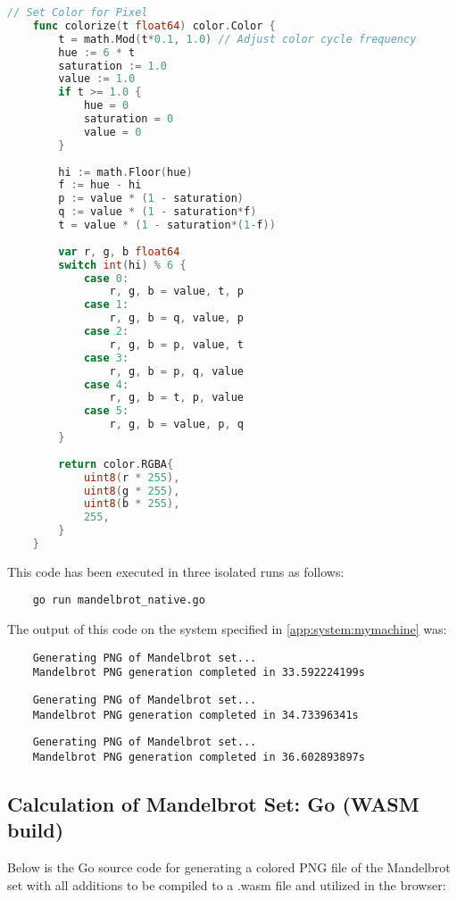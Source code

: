 \begin{lstlisting}[language=go, frame=tb, caption={Mandelbrot Set Calculation}]
    // Set Color for Pixel
    func colorize(t float64) color.Color {
        t = math.Mod(t*0.1, 1.0) // Adjust color cycle frequency
        hue := 6 * t
        saturation := 1.0
        value := 1.0
        if t >= 1.0 {
            hue = 0
            saturation = 0
            value = 0
        }
    
        hi := math.Floor(hue)
        f := hue - hi
        p := value * (1 - saturation)
        q := value * (1 - saturation*f)
        t = value * (1 - saturation*(1-f))
    
        var r, g, b float64
        switch int(hi) % 6 {
            case 0:
                r, g, b = value, t, p
            case 1:
                r, g, b = q, value, p
            case 2:
                r, g, b = p, value, t
            case 3:
                r, g, b = p, q, value
            case 4:
                r, g, b = t, p, value
            case 5:
                r, g, b = value, p, q
        }
    
        return color.RGBA{
            uint8(r * 255),
            uint8(g * 255),
            uint8(b * 255),
            255,
        }
    }    
\end{lstlisting}

This code has been executed in three isolated runs as follows:
\begin{lstlisting}
    go run mandelbrot_native.go
\end{lstlisting}

The output of this code on the system specified in \ref{app:system:mymachine} was:
\begin{lstlisting}
    Generating PNG of Mandelbrot set... 
    Mandelbrot PNG generation completed in 33.592224199s
\end{lstlisting}
\begin{lstlisting}
    Generating PNG of Mandelbrot set... 
    Mandelbrot PNG generation completed in 34.73396341s
\end{lstlisting}
\begin{lstlisting}
    Generating PNG of Mandelbrot set... 
    Mandelbrot PNG generation completed in 36.602893897s
\end{lstlisting}

\subsection{Calculation of Mandelbrot Set: Go (WASM build)}
\label{app:code:mandelbrot2}
Below is the Go source code for generating a colored PNG file of the Mandelbrot set with all additions to be compiled to a .wasm file and utilized in the browser:

